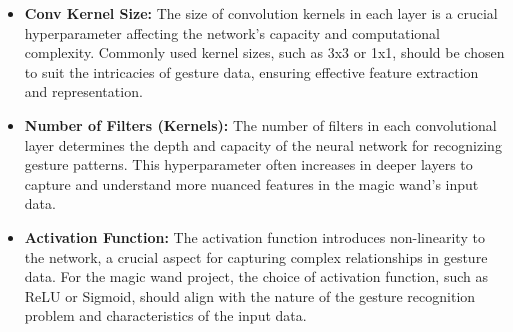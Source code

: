 \begin{itemize}
	\item \textbf{Conv Kernel Size:} The size of convolution kernels in each layer is a crucial hyperparameter affecting the network's capacity and computational complexity. Commonly used kernel sizes, such as 3x3 or 1x1, should be chosen to suit the intricacies of gesture data, ensuring effective feature extraction and representation.
	
	\item \textbf{Number of Filters (Kernels):} The number of filters in each convolutional layer determines the depth and capacity of the neural network for recognizing gesture patterns. This hyperparameter often increases in deeper layers to capture and understand more nuanced features in the magic wand's input data.
	
	\item \textbf{Activation Function:} The activation function introduces non-linearity to the network, a crucial aspect for capturing complex relationships in gesture data. For the magic wand project, the choice of activation function, such as ReLU or Sigmoid, should align with the nature of the gesture recognition problem and characteristics of the input data.
	
\end{itemize}


